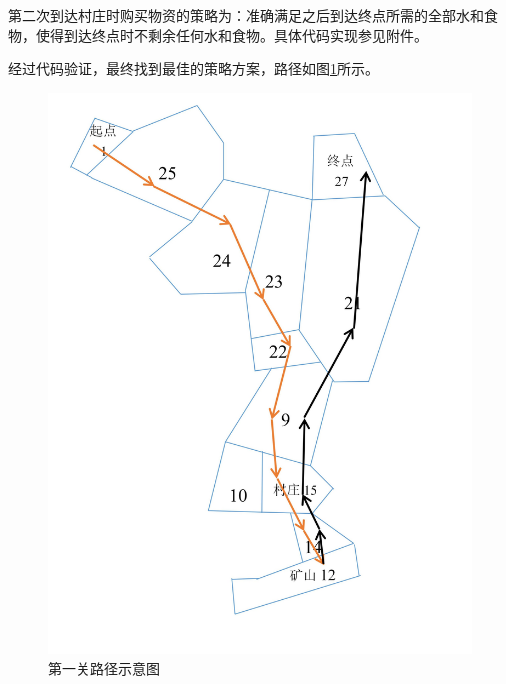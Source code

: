 \documentclass[withoutpre]{cumcmthesis} %
\begin{document}
第二次到达村庄时购买物资的策略为：准确满足之后到达终点所需的全部水和食物，使得到达终点时不剩余任何水和食物。具体代码实现参见附件。

经过代码验证，最终找到最佳的策略方案，路径如图\ref{fig:map1word}所示。
\begin{figure}[h]
	\centering
	\includegraphics[scale=0.1]{figures/map1word.jpg}
	\caption{第一关路径示意图}
	\label{fig:map1word}
\end{figure}


\begin{thebibliography}{9}%

    

\end{thebibliography}
\end{document}
